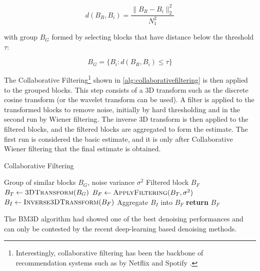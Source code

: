 $$d(B_R, B_i) = \frac{\|B_R - B_i\|_2^2}{N_1^2}$$

with group $B_G$ formed by selecting blocks that have distance below the threshold $\tau$:

$$B_G = \{ B_i : d(B_R, B_i) \leq \tau \}$$

The Collaborative Filtering\footnote{Interestingly, collaborative filtering has been the backbone of recommendation systems such as by Netflix and Spotify \cite{bellLessonsNetflixPrize2007,drorYahooMusicDataset2012}.} shown in \cref{alg:collaborativefiltering} is then applied to the grouped blocks. This step consists of a 3D transform such as the discrete cosine transform (or the wavelet transform can be used).
A filter is applied to the transformed blocks to remove noise, initially by hard thresholding and in the second run by Wiener filtering. The inverse 3D transform is then applied to the filtered blocks, and the filtered blocks are aggregated to form the estimate. The first run is considered the basic estimate, and it is only after Collaborative Wiener filtering that the final estimate is obtained.
    
\begin{algorithm}
    \caption{Collaborative Filtering}\label{alg:collaborativefiltering}
    \begin{algorithmic}[1]
    \Require Group of similar blocks $B_{G}$, noise variance $\sigma^2$
    \Ensure Filtered block $B_{F}$
        \State $B_{T} \gets \textsc{3DTransform}(B_{G})$
        \State $B_{F} \gets \textsc{ApplyFiltering}(B_{T}, \sigma^2)$
        \State $B_{I} \gets \textsc{Inverse3DTransform}(B_{F})$
        \State Aggregate $B_{I}$ into $B_{F}$
        \State \textbf{return} $B_{F}$
    \EndProcedure
    \end{algorithmic}
\end{algorithm}

The \gls{BM3D} algorithm had showed one of the best denoising performances and can only be contested by the recent deep-learning based denoising methods. 

